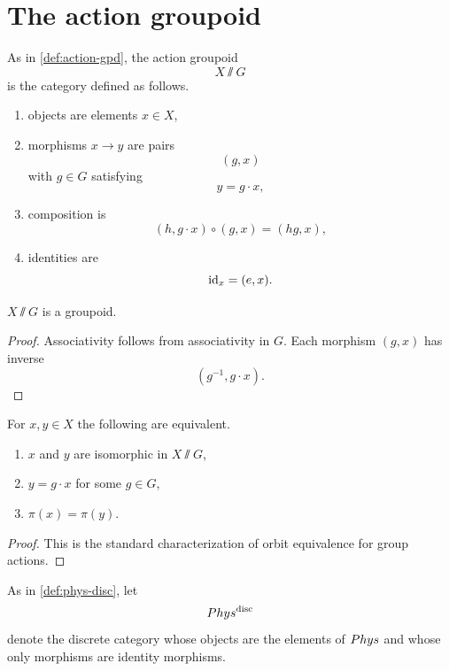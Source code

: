 \section{The action groupoid}
\label{sec:lift-groupoid}
\begin{definition}
	As in \cref{def:action-gpd}, the action groupoid
	\[
		X\sslash G
	\]
	is the category defined as follows.
	\begin{enumerate}[label=\textup{(\arabic*)}]
		\item objects are elements \(x\in X\),
		\item morphisms \(x\to y\) are pairs
		      \[
			      (g,x)
		      \]
		      with \(g\in G\) satisfying
		      \[
			      y=g\cdot x,
		      \]
		\item composition is
		      \[
			      (h,g\cdot x)\circ(g,x)=(hg,x),
		      \]
		\item identities are
		      \[
			      \operatorname{id}_x=(e,x).
		      \]
	\end{enumerate}
\end{definition}
\begin{lemma}
	\(X\sslash G\) is a groupoid.
\end{lemma}
\begin{proof}
	Associativity follows from associativity in \(G\).
	Each morphism \((g,x)\) has inverse
	\[
		(g^{-1},g\cdot x).
	\]
\end{proof}
\begin{lemma}
	\label{lem:orbit-connectivity}
	For \(x,y\in X\) the following are equivalent.
	\begin{enumerate}[label=\textup{(\roman*)}]
		\item \(x\) and \(y\) are isomorphic in \(X\sslash G\),
		\item \(y=g\cdot x\) for some \(g\in G\),
		\item \(\pi(x)=\pi(y)\).
	\end{enumerate}
\end{lemma}
\begin{proof}
	This is the standard characterization of orbit equivalence for group
	actions.
\end{proof}
\begin{definition}
	As in \cref{def:phys-disc}, let
	\[
		Phys^{\mathrm{disc}}
	\]
	denote the discrete category whose objects are the elements of
	\(Phys\) and whose only morphisms are identity morphisms.
\end{definition}
